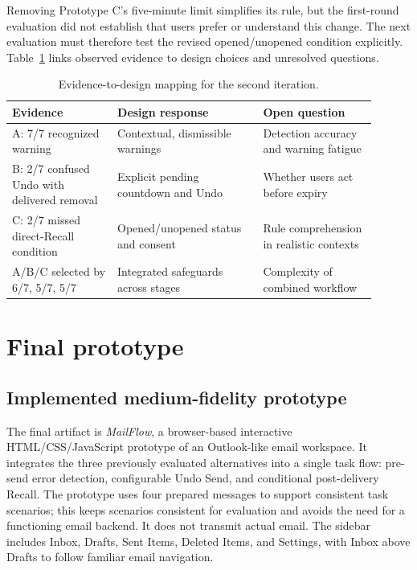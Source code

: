 \documentclass[letterpaper]{jdf}
\begin{document}
Removing Prototype C's five-minute limit simplifies its rule, but the first-round evaluation did not establish that users prefer or understand this change. The next evaluation must therefore test the revised opened/unopened condition explicitly. Table~\ref{tab:iteration-decisions} links observed evidence to design choices and unresolved questions.

\begin{table}[!htbp]
\centering\small
\caption{Evidence-to-design mapping for the second iteration.}
\label{tab:iteration-decisions}
\begin{tabular}{p{0.26\linewidth}p{0.36\linewidth}p{0.28\linewidth}}
\toprule
Evidence & Design response & Open question \\
\midrule
A: 7/7 recognized warning & Contextual, dismissible warnings & Detection accuracy and warning fatigue \\
B: 2/7 confused Undo with delivered removal & Explicit pending countdown and Undo & Whether users act before expiry \\
C: 2/7 missed direct-Recall condition & Opened/unopened status and consent & Rule comprehension in realistic contexts \\
A/B/C selected by 6/7, 5/7, 5/7 & Integrated safeguards across stages & Complexity of combined workflow \\
\bottomrule
\end{tabular}
\end{table}

\section{Final prototype}
\subsection{Implemented medium-fidelity prototype}




The final artifact is \emph{MailFlow}, a browser-based interactive HTML/CSS/JavaScript prototype of an Outlook-like email workspace. It integrates the three previously evaluated alternatives into a single task flow: pre-send error detection, configurable Undo Send, and conditional post-delivery Recall. The prototype uses four prepared messages to support consistent task scenarios; this keeps scenarios consistent for evaluation and avoids the need for a functioning email backend. It does not transmit actual email. The sidebar includes Inbox, Drafts, Sent Items, Deleted Items, and Settings, with Inbox above Drafts to follow familiar email navigation.
\end{document}
